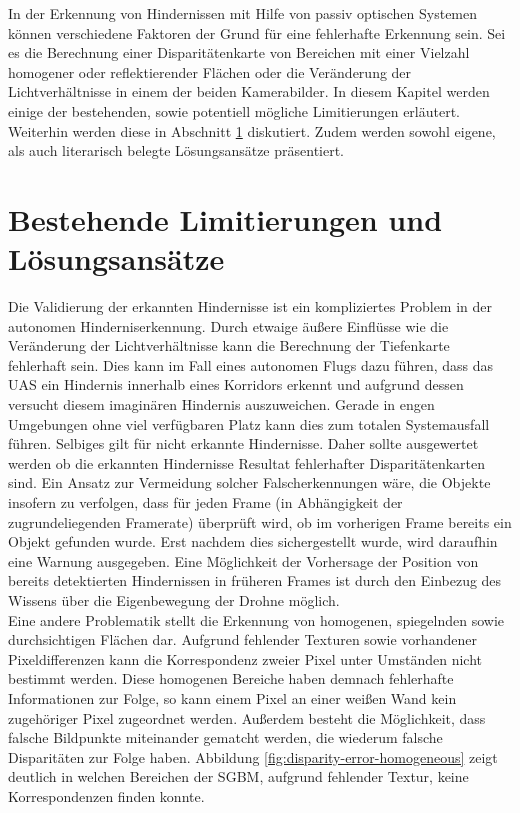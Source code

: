 In der Erkennung von Hindernissen mit Hilfe von passiv optischen Systemen können verschiedene Faktoren der Grund für eine fehlerhafte Erkennung sein. Sei es die Berechnung einer Disparitätenkarte von Bereichen mit einer Vielzahl homogener oder reflektierender Flächen oder die Veränderung der Lichtverhältnisse in einem der beiden Kamerabilder. In diesem Kapitel werden einige der bestehenden, sowie potentiell mögliche Limitierungen erläutert. Weiterhin werden diese in Abschnitt \ref{sec:existing_conflicts} diskutiert. Zudem werden sowohl eigene, als auch literarisch belegte Lösungsansätze präsentiert.\\

\section{Bestehende Limitierungen und Lösungsansätze}
\label{sec:existing_conflicts}

Die Validierung der erkannten Hindernisse ist ein kompliziertes Problem in der autonomen Hinderniserkennung. Durch etwaige äußere Einflüsse wie die Veränderung der Lichtverhältnisse kann die Berechnung der Tiefenkarte fehlerhaft sein. Dies kann im Fall eines autonomen Flugs dazu führen, dass das UAS ein Hindernis innerhalb eines Korridors erkennt und aufgrund dessen versucht diesem imaginären Hindernis auszuweichen. Gerade in engen Umgebungen ohne viel verfügbaren Platz kann dies zum totalen Systemausfall führen. Selbiges gilt für nicht erkannte Hindernisse. Daher sollte ausgewertet werden ob die erkannten Hindernisse Resultat fehlerhafter Disparitätenkarten sind. Ein Ansatz zur Vermeidung solcher Falscherkennungen wäre, die Objekte insofern zu verfolgen, dass für jeden Frame (in Abhängigkeit der zugrundeliegenden Framerate) überprüft wird, ob im vorherigen Frame bereits ein Objekt gefunden wurde. Erst nachdem dies sichergestellt wurde, wird daraufhin eine Warnung ausgegeben. Eine Möglichkeit der Vorhersage der Position von bereits detektierten Hindernissen in früheren Frames ist durch den Einbezug des Wissens über die Eigenbewegung der Drohne möglich.\\

\noindent
Eine andere Problematik stellt die Erkennung von homogenen, spiegelnden sowie durchsichtigen Flächen dar. Aufgrund fehlender Texturen sowie vorhandener Pixeldifferenzen kann die Korrespondenz zweier Pixel unter Umständen nicht bestimmt werden. Diese homogenen Bereiche haben demnach fehlerhafte Informationen zur Folge, so kann einem Pixel an einer weißen Wand kein zugehöriger Pixel zugeordnet werden. Außerdem besteht die Möglichkeit, dass falsche Bildpunkte miteinander gematcht werden, die wiederum falsche Disparitäten zur Folge haben. Abbildung \ref{fig:disparity-error-homogeneous} zeigt deutlich in welchen Bereichen der SGBM, aufgrund fehlender Textur, keine Korrespondenzen finden konnte.\\

